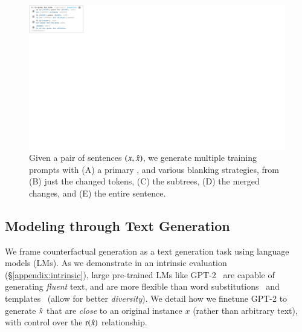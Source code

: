 \begin{figure}[t]
\centering
\includegraphics[trim={0 30.7cm 53.2cm 0cm}, clip, width=1\columnwidth]{figures/blank.pdf}
\vspace{-15pt}
\caption{Given a pair of sentences $(x, \hat{x})$, we generate multiple training prompts with (A) a primary \tagstr, and various blanking strategies, from (B) just the changed tokens, (C) the subtrees, (D) the merged changes, and (E) the entire sentence.
}
\vspace{-10pt}
\label{fig:blank}
\end{figure}

\subsection{Modeling through Text Generation}
\label{subsec:nlg}

We frame counterfactual generation as a text generation task using language models (LMs).
As we demonstrate in an intrinsic evaluation (\S\ref{appendix:intrinsic}), large pre-trained LMs like GPT-2~\cite{radford2019language} are capable of generating \emph{fluent} text, and are more flexible than word substitutions~\cite{garg2019counterfactual} and templates~\cite{ribeiro2018sear, wu2019errudite} (\ie allow for better \emph{diversity}). 
We detail how we finetune GPT-2 to generate $\hat{x}$ that are \emph{close} to an original instance $x$ (rather than arbitrary text), with control over the $\operatorname*{r}(\hat{x})$ relationship.

